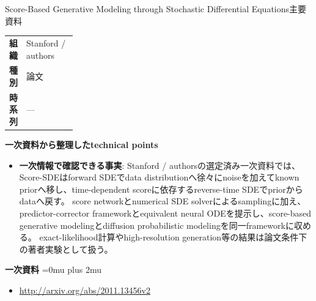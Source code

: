 \begin{technicalnote}{Score-Based Generative Modeling through Stochastic Differential Equations}{主要資料}
\begingroup
\begin{tabularx}{\linewidth}{@{}>{\bfseries}p{0.22\linewidth}X@{}}
組織 & Stanford / authors \\
種別 & 論文 \\
時系列 & — \\
\end{tabularx}
\smallskip
{\bfseries 一次資料から整理したtechnical points}
\begin{minipage}{\linewidth}
\begin{itemize}[leftmargin=1.5em,itemsep=0.35em]
\item \textbf{一次情報で確認できる事実}: Stanford / authorsの選定済み一次資料では、Score-SDEはforward SDEでdata distributionへ徐々にnoiseを加えてknown priorへ移し、time-dependent scoreに依存するreverse-time SDEでpriorからdataへ戻す。 score networkとnumerical SDE solverによるsamplingに加え、predictor-corrector frameworkとequivalent neural ODEを提示し、score-based generative modelingとdiffusion probabilistic modelingを同一frameworkに収める。 exact-likelihood計算やhigh-resolution generation等の結果は論文条件下の著者実験として扱う。
\end{itemize}
\begin{minipage}{\linewidth}
\begin{samepage}
{\bfseries 一次資料}
\begingroup\sloppy
\Urlmuskip=0mu plus 2mu\relax
\begin{itemize}[leftmargin=1.5em,itemsep=0.25em]
\item {\scriptsize\url{http://arxiv.org/abs/2011.13456v2}}
\end{itemize}
\endgroup
\end{samepage}
\end{minipage}
\end{minipage}
\endgroup
\end{technicalnote}
\medskip
